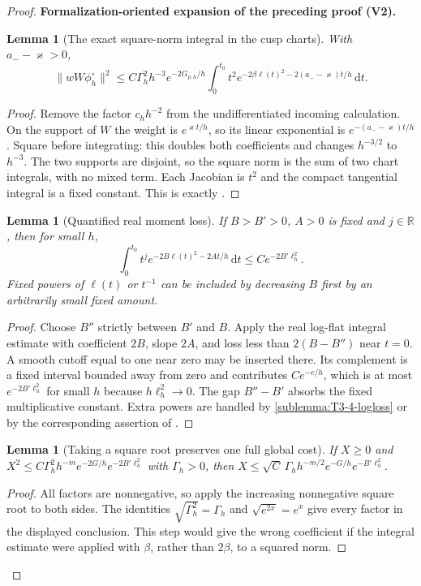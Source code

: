 \documentclass[11pt]{article}
\newtheorem{lemma}[theorem]{Lemma}
\newcommand{\formalisationparentid}{X}
\newenvironment{formalisationaddition}[1]{\par\medskip\begingroup\color{blue}\def\formalisationparentid{#1}\setcounter{formalizationsublemma}{0}\let\lemma\formalizationsublemma\let\endlemma\endformalizationsublemma
  \def\Eo{\mathcal E_h^\circ}\def\EE{\mathcal E_h}\def\phio{\phi_h^\circ}\def\phih{\phi_h}\def\Ho{H_h^{\rm atom}(v^\circ)}\def\Ha{H_h^{\rm atom}}\def\HL{H_h^{L}}\def\Dh{D_h}\def\Log{\operatorname{Log}}\def\ellh{\ell_h}\def\Gp{G_{p,h}}\def\Ast{A_{*,h}}\def\ahat{\widehat{\mathfrak a}_h}\def\ah{\mathfrak a_h}\def\rh{\widehat\rho_h}\def\deltah{\widehat\delta_h}\def\oldref##1{\textup{(##1)}}\def\interface##1{\par\noindent\textit{Analytical interface used here.} ##1\par}\def\finish{\par\noindent\textit{Conclusion of the formalization-oriented expansion.} }\par\noindent\textbf{Formalization-oriented expansion of the preceding proof (V2).}\par\smallskip
}{\par\endgroup\medskip
}
\newcommand{\R}{\mathbb R}
\begin{document}
\begin{proof}
\begin{formalisationaddition}{T3.4}
\begin{lemma}[The exact square-norm integral in the cusp charts]\label{sublemma:T3-4-square-integral}
With $a_--\varkappa>0$,
\[
 \|wW\phio\|^2\le C\Gamma_h^2h^{-3}e^{-2G_{p,h}/h}
 \int_0^{t_0}t^2
 e^{-2\beta\ell(t)^2-2(a_--\varkappa)t/h}\,\mathrm dt.
\]
\end{lemma}
\begin{proof}
Remove the factor $c_hh^{-2}$ from the undifferentiated incoming
calculation. On the support of $W$ the weight is $e^{\varkappa t/h}$,
so its linear exponential is $e^{-(a_--\varkappa)t/h}$.
Square before integrating: this doubles both coefficients and changes
$h^{-3/2}$ to $h^{-3}$. The two supports are disjoint, so the square
norm is the sum of two chart integrals, with no mixed term.
Each Jacobian is $t^2$ and the compact tangential integral is a fixed
constant. This is exactly .
\end{proof}

\begin{lemma}[Quantified real moment loss]\label{sublemma:T3-4-real-moment}
If $B>B'>0$, $A>0$ is fixed and $j\in\R$, then for small $h$,
\[
 \int_0^{t_0}t^je^{-2B\ell(t)^2-2At/h}\,\mathrm dt
                    \le C e^{-2B'\ell_h^2}.
\]
Fixed powers of $\ell(t)$ or $t^{-1}$ can be included by decreasing
$B$ first by an arbitrarily small fixed amount.
\end{lemma}
\begin{proof}
Choose $B''$ strictly between $B'$ and $B$. Apply the real log-flat
integral estimate  with coefficient $2B$,
slope $2A$, and loss less than $2(B-B'')$ near $t=0$.
A smooth cutoff equal to one near zero may be inserted there. Its
complement is a fixed interval bounded away from zero and contributes
$Ce^{-c/h}$, which is at most $e^{-2B'\ell_h^2}$ for small $h$ because
$h\ell_h^2\to0$. The gap $B''-B'$ absorbs the fixed multiplicative
constant. Extra powers are handled by \ref{sublemma:T3-4-logloss} or
by the corresponding assertion of .
\end{proof}

\begin{lemma}[Taking a square root preserves one full global cost]\label{sublemma:T3-4-square-root}
If $X\ge0$ and
$X^2\le C\Gamma_h^2h^{-m}e^{-2G/h}e^{-2B'\ell_h^2}$ with
$\Gamma_h>0$, then
$X\le\sqrt C\,\Gamma_hh^{-m/2}e^{-G/h}e^{-B'\ell_h^2}$.
\end{lemma}
\begin{proof}
All factors are nonnegative, so apply the increasing nonnegative square
root to both sides. The identities $\sqrt{\Gamma_h^2}=\Gamma_h$ and
$\sqrt{e^{2x}}=e^x$ give every factor in the displayed conclusion.
This step would give the wrong coefficient if the integral estimate
were applied with $\beta$, rather than $2\beta$, to a squared norm.
\end{proof}


\end{formalisationaddition}
\end{proof}
\end{document}
